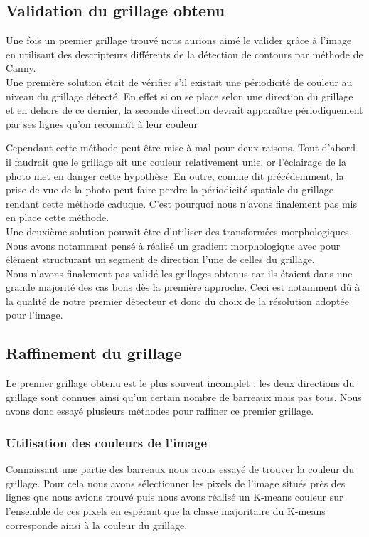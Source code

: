 \subsection{Validation du grillage obtenu}
Une fois un premier grillage trouvé nous aurions aimé le valider grâce à l'image en utilisant des descripteurs différents de la détection de contours par méthode de Canny.
\\

Une première solution était de vérifier s'il existait une périodicité de couleur au niveau du grillage détecté. En effet si on se place selon une direction du grillage et en dehors de ce dernier, la seconde direction devrait apparaître périodiquement par ses lignes qu'on reconnaît à leur couleur

Cependant cette méthode peut être mise à mal pour deux raisons. Tout d'abord il faudrait que le grillage ait une couleur relativement unie, or l'éclairage de la photo met en danger cette hypothèse. En outre, comme dit précédemment, la prise de vue de la photo peut faire perdre la périodicité spatiale du grillage rendant cette méthode caduque. C'est pourquoi nous n'avons finalement pas mis en place cette méthode.
\\

Une deuxième solution pouvait être d'utiliser des transformées morphologiques. Nous avons notamment pensé à réalisé un gradient morphologique avec pour élément structurant un segment de direction l'une de celles du grillage.
\\

Nous n'avons finalement pas validé les grillages obtenus car ils étaient dans une grande majorité des cas bons dès la première approche. Ceci est notamment dû à la qualité de notre premier détecteur et donc du choix de la résolution adoptée pour l'image.


\subsection{Raffinement du grillage}
Le premier grillage obtenu est le plus souvent incomplet : les deux directions du grillage sont connues ainsi qu'un certain nombre de barreaux mais pas tous. Nous avons donc essayé plusieurs méthodes pour raffiner ce premier grillage.


\subsubsection{Utilisation des couleurs de l'image}
Connaissant une partie des barreaux nous avons essayé de trouver la couleur du grillage. Pour cela nous avons sélectionner les pixels de l'image situés près des lignes que nous avions trouvé puis nous avons réalisé un K-means couleur sur l'ensemble de ces pixels en espérant que la classe majoritaire du K-means corresponde ainsi à la couleur du grillage.

